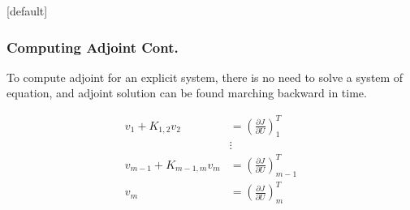 \documentclass{beamer}
\makeatletter
\newenvironment{withoutheadline}{
        \setbeamertemplate{headline}[default]
        \def\beamer@entrycode{\vspace*{-\headheight}}
    }{}
\makeatother
\begin{document}
\begin{withoutheadline}
\begin{frame}\frametitle{Computing Adjoint Cont.} 
\begin{tcolorbox}[colback=blue!5,colframe=blue!75!black,title= Important conclusion:]
To compute adjoint for an explicit system, there is no need to solve a system of equation, and adjoint solution can be found marching backward in time.
\end{tcolorbox}

  \begin{displaymath}
  \begin{aligned}
 v_1 + K_{1,2} v_2 &=\left(\frac{\partial J}{\partial U}\right)_1^T \\
 &\vdots\\
 v_{m-1} + K_{m-1,m} v_m &=\left(\frac{\partial J}{\partial U}\right)_{m-1}^T \\
v_m &=\left(\frac{\partial J}{\partial U}\right)_m^T
 \end{aligned}
\end{displaymath}

\end{frame}
\end{withoutheadline}
\end{document}

